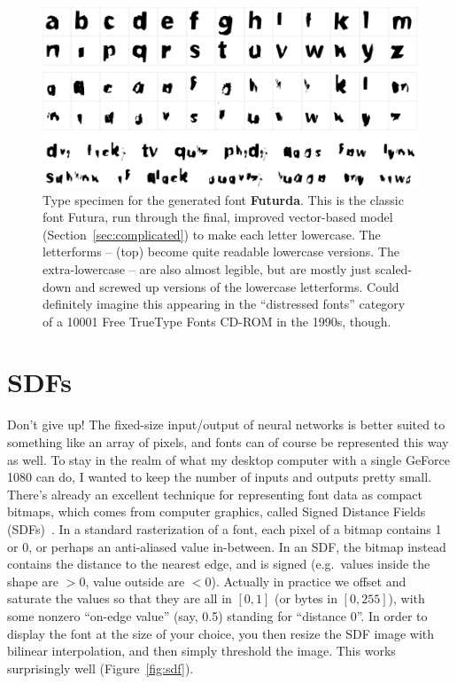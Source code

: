 \documentclass[twocolumn]{article}
\begin{document}

\begin{figure}[tp]
\centering
  \includegraphics[width=0.95 \linewidth]{futurda}
\caption{ Type specimen for the generated font {\bf Futurda}. This is
  the classic font Futura, run through the final, improved
  vector-based model (Section~\ref{sec:complicated}) to make each
  letter lowercase. The letterforms --
  (top) become quite readable lowercase versions. The extra-lowercase
  -- are also almost legible, but are
  mostly just scaled-down and screwed up versions of the lowercase
  letterforms. Could definitely imagine this appearing in the
  ``distressed fonts'' category of a 10001 Free TrueType Fonts CD-ROM
  in the 1990s, though.
} \label{fig:futurda}
\end{figure}




\section{SDFs}

Don't give up! The fixed-size input/output of neural networks is
better suited to something like an array of pixels, and fonts can of
course be represented this way as well. To stay in the realm of what
my desktop computer with a single GeForce 1080 can do, I wanted to
keep the number of inputs and outputs pretty small. There's already an
excellent technique for representing font data as compact bitmaps,
which comes from computer graphics, called Signed Distance Fields
(SDFs)~\cite{green2007improved}. In a standard rasterization of a
font, each pixel of a bitmap contains 1 or 0, or perhaps an
anti-aliased value in-between. In an SDF, the bitmap instead contains
the distance to the nearest edge, and is signed (e.g.~values inside
the shape are $> 0$, value outside are $< 0$). Actually in
practice we offset and saturate the values so that they are all in
$[0,1]$ (or bytes in $[0,255]$), with some nonzero ``on-edge value''
(say, 0.5) standing for ``distance 0''. In order to display the font
at the size of your choice, you then resize the SDF image with bilinear
interpolation, and then simply threshold the image. This works
surprisingly well (Figure~\ref{fig:sdf}).
\end{document}
